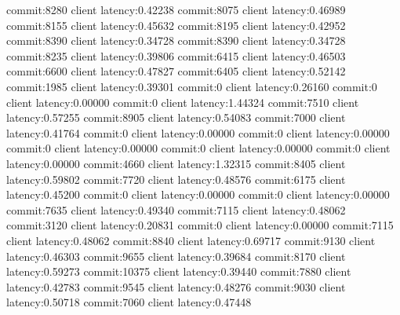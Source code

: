 commit:8280 client latency:0.42238
commit:8075 client latency:0.46989
commit:8155 client latency:0.45632
commit:8195 client latency:0.42952
commit:8390 client latency:0.34728
commit:8390 client latency:0.34728
commit:8235 client latency:0.39806
commit:6415 client latency:0.46503
commit:6600 client latency:0.47827
commit:6405 client latency:0.52142
commit:1985 client latency:0.39301
commit:0 client latency:0.26160
commit:0 client latency:0.00000
commit:0 client latency:1.44324
commit:7510 client latency:0.57255
commit:8905 client latency:0.54083
commit:7000 client latency:0.41764
commit:0 client latency:0.00000
commit:0 client latency:0.00000
commit:0 client latency:0.00000
commit:0 client latency:0.00000
commit:0 client latency:0.00000
commit:4660 client latency:1.32315
commit:8405 client latency:0.59802
commit:7720 client latency:0.48576
commit:6175 client latency:0.45200
commit:0 client latency:0.00000
commit:0 client latency:0.00000
commit:7635 client latency:0.49340
commit:7115 client latency:0.48062
commit:3120 client latency:0.20831
commit:0 client latency:0.00000
commit:7115 client latency:0.48062
commit:8840 client latency:0.69717
commit:9130 client latency:0.46303
commit:9655 client latency:0.39684
commit:8170 client latency:0.59273
commit:10375 client latency:0.39440
commit:7880 client latency:0.42783
commit:9545 client latency:0.48276
commit:9030 client latency:0.50718
commit:7060 client latency:0.47448
